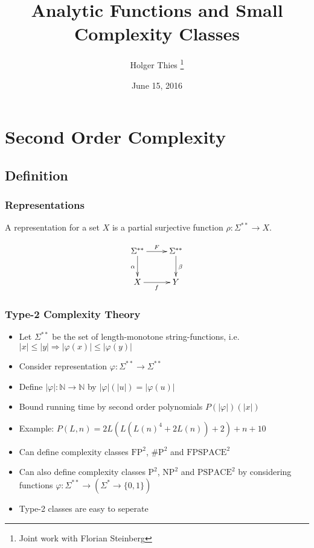 \documentclass[xcolor=pdftex,dvipsnames,table]{beamer}
\title[Analytic Functions]{Analytic Functions and Small Complexity Classes}
\author[ H. Thies]{
		Holger Thies \footnote{Joint work with Florian Steinberg}
}
\institute[The University of Tokyo]{
  The University of Tokyo
}
\newcommand{\N}{\ensuremath{\mathbb{N}}}
\newcommand{\sigmas}{\ensuremath{\Sigma^{**}}}
\newcommand{\abs}[1]{\left|#1\right|}
\newcommand{\fpt}{\ensuremath{\text{FP}^2}\xspace}
\newcommand{\fpspacet}{\ensuremath{\text{FPSPACE}^2}\xspace}
\newcommand{\sharpt}{\ensuremath{\text{\#P}^2}\xspace}
\newcommand{\pt}{\ensuremath{\text{P}^2}\xspace}
\newcommand{\npt}{\ensuremath{\text{NP}^2}\xspace}
\newcommand{\pspacet}{\ensuremath{\text{PSPACE}^2}\xspace}
\begin{document}
\date{June 15, 2016}
\frame{
\titlepage
}
\section{Second Order Complexity}
\subsection{Definition}
\begin{frame}
  \frametitle{Representations}
  A representation for a set $X$ is a partial surjective function $\rho: \Sigma^{**} \to X$.
  \pause
  \vfill
  \begin{minipage}{.37\textwidth}
  \begin{displaymath}
    \xymatrix{
        \Sigma^{**} \ar[r]^F \ar[d]_\alpha & \Sigma^{**} \ar[d]^{\beta} \\
        X \ar[r]_{f}       & Y }
  \end{displaymath} 
  \end{minipage}
  \hfill
  \pause
  \begin{minipage}{.45\textwidth}
  \end{minipage}
  \end{frame}
\begin{frame}
  \frametitle{Type-2 Complexity Theory}
  \begin{itemize}
  \item Let $\sigmas$ be the set of length-monotone string-functions, i.e. $\abs{x} \leq \abs{y} \Rightarrow \abs{\varphi(x)} \leq \abs{\varphi(y)}$
  \item Consider representation $\varphi : \sigmas \to \sigmas$
  \item Define $\abs{\varphi} : \N \to \N$ by $\abs{\varphi}(\abs{u}) = \abs{\varphi(u)}$
   \item Bound running time by second order polynomials $P(\abs{\varphi})(\abs{x})$
   \item Example: $P(L,n) = 2L(L(L(n)^4+2L(n))+2)+n+10$
   \item  Can define complexity classes \fpt, \sharpt and \fpspacet 
   \item  Can also define complexity classes \pt, \npt and \pspacet by considering functions $\varphi : \sigmas \to (\Sigma^* \to \{0,1\})$
     \item Type-2 classes are easy to seperate
  
  \end{itemize}
\end{frame}
\end{document}
